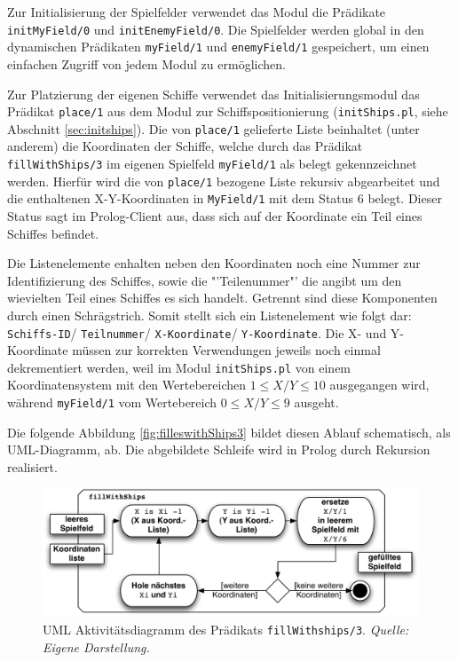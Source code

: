	Zur Initialisierung der Spielfelder verwendet das Modul die Prädikate \texttt{initMyField/0} und \texttt{initEnemyField/0}.
	Die Spielfelder werden global in den dynamischen Prädikaten \texttt{myField/1} und \texttt{enemyField/1}
	gespeichert, um einen einfachen Zugriff von jedem Modul zu ermöglichen. 
	 
	Zur Platzierung der eigenen Schiffe verwendet das Initialisierungsmodul das Prädikat \texttt{place/1} aus dem Modul zur 
	Schiffspositionierung (\texttt{initShips.pl}, siehe Abschnitt \ref{sec:initships}).
	Die von \texttt{place/1} gelieferte Liste beinhaltet (unter anderem) die Koordinaten der Schiffe, welche durch das Prädikat 
	\texttt{fillWithShips/3} im eigenen Spielfeld \texttt{myField/1} als belegt gekennzeichnet werden. Hierfür wird 
	die von \texttt{place/1} bezogene Liste rekursiv abgearbeitet und die enthaltenen X-Y-Koordinaten in \texttt{MyField/1} mit dem 
	Status 6 belegt. Dieser Status sagt im Prolog-Client aus, dass sich auf der Koordinate ein Teil eines Schiffes befindet.
	
	Die Listenelemente enhalten neben den Koordinaten noch eine Nummer zur Identifizierung des Schiffes, sowie die "'Teilenummer"' 
	die angibt um den wievielten Teil eines Schiffes es sich handelt. Getrennt sind diese Komponenten durch einen Schrägstrich. Somit 
	stellt sich ein Listenelement wie folgt dar: \texttt{Schiffs-ID}/ \texttt{Teilnummer}/ \texttt{X-Koordinate}/ \texttt{Y-Koordinate}.
	Die X- und Y-Koordinate müssen zur korrekten Verwendungen jeweils noch einmal dekrementiert werden, weil im Modul \texttt{initShips.pl} von 
	einem Koordinatensystem mit den Wertebereichen $1\le X/Y\le 10$ ausgegangen wird, während \texttt{myField/1} vom Wertebereich $0\le X/Y\le 9$ ausgeht.
	
	Die folgende Abbildung \ref{fig:filleswithShips3} bildet diesen Ablauf schematisch, als UML-Diagramm, ab. Die abgebildete Schleife 
	wird in Prolog durch Rekursion realisiert.
	\begin{figure}[H] %
		\centering
		\includegraphics[width=.9\textwidth]{images/fillWithShips.pdf}
		\caption{UML Aktivitätsdiagramm des Prädikats \texttt{fillWithships/3}. \emph{Quelle: Eigene Darstellung.}}
		\label{fig:fillwithShips3}
	\end{figure}


